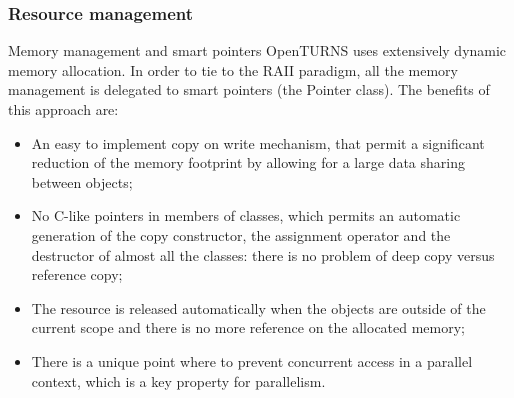 \documentclass[8pt]{beamer}
\begin{document}
\begin{frame}
  \frametitle{Resource management}
  \begin{block}{Memory management and smart pointers}
    OpenTURNS uses extensively dynamic memory allocation. In order to tie to the RAII paradigm, all the memory management is delegated to smart pointers (the \alert{Pointer} class). The benefits of this approach are:
    \begin{itemize}
    \item An easy to implement \alert{copy on write} mechanism, that permit a significant reduction of the memory footprint by allowing for a large data sharing between objects;
    \item \alert{No C-like pointers in members of classes}, which permits an automatic generation of the copy constructor, the assignment operator and the destructor of almost all the classes: there is no problem of deep copy versus reference copy;
    \item \alert{The resource is released automatically} when the objects are outside of the current scope and there is no more reference on the allocated memory;
    \item There is \alert{a unique point where to prevent concurrent access} in a parallel context, which is a key property for parallelism.
    \end{itemize}
  \end{block}
\end{frame}
\end{document}
